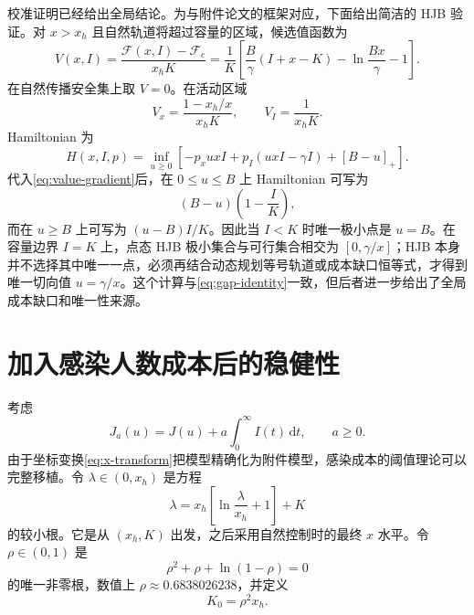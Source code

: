 \documentclass[11pt,a4paper,UTF8]{ctexart}
\theoremstyle{definition}
\newcommand{\Fcal}{\mathcal{F}}
\newcommand{\pos}[1]{\left[#1\right]_{+}}
\newcommand{\dd}{\,\mathrm{d}}
\begin{document}
校准证明已经给出全局结论。为与附件论文的框架对应，下面给出简洁的 HJB 验证。对 $x>x_h$ 且自然轨道将超过容量的区域，候选值函数为
\begin{equation}
V(x,I)=\frac{\Fcal(x,I)-\Fcal_c}{x_hK}
=\frac1K\left[
\frac{B}{\gamma}(I+x-K)-\ln\frac{Bx}{\gamma}-1
\right].
\label{eq:value-explicit}
\end{equation}
在自然传播安全集上取 $V=0$。在活动区域
\begin{equation}
V_x=\frac{1-x_h/x}{x_hK},\qquad
V_I=\frac1{x_hK}.
\label{eq:value-gradient}
\end{equation}
Hamiltonian 为
\begin{equation}
H(x,I,p)=\inf_{u\ge0}
\left[-p_xuxI+p_I(uxI-\gamma I)+\pos{B-u}\right].
\label{eq:Hamiltonian}
\end{equation}
代入\eqref{eq:value-gradient}后，在 $0\le u\le B$ 上 Hamiltonian 可写为
\[
(B-u)\left(1-\frac{I}{K}\right),
\]
而在 $u\ge B$ 上可写为 $(u-B)I/K$。因此当 $I<K$ 时唯一极小点是 $u=B$。在容量边界 $I=K$ 上，点态 HJB 极小集合与可行集合相交为 $[0,\gamma/x]$；HJB 本身并不选择其中唯一一点，必须再结合动态规划等号轨道或成本缺口恒等式，才得到唯一切向值 $u=\gamma/x$。这个计算与\eqref{eq:gap-identity}一致，但后者进一步给出了全局成本缺口和唯一性来源。

\section{加入感染人数成本后的稳健性}

考虑
\begin{equation}
J_a(u)=J(u)+a\int_0^\infty I(t)\dd t,
\qquad a\ge0.
\label{eq:infection-cost}
\end{equation}
由于坐标变换\eqref{eq:x-transform}把模型精确化为附件模型，感染成本的阈值理论可以完整移植。令 $\lambda\in(0,x_h)$ 是方程
\begin{equation}
\lambda=x_h\left[\ln\frac{\lambda}{x_h}+1\right]+K
\label{eq:lambda-equation}
\end{equation}
的较小根。它是从 $(x_h,K)$ 出发，之后采用自然控制时的最终 $x$ 水平。令 $\rho\in(0,1)$ 是
\begin{equation}
\rho^2+\rho+\ln(1-\rho)=0
\label{eq:rho-equation}
\end{equation}
的唯一非零根，数值上 $\rho\approx0.6838026238$，并定义
\begin{equation}
K_0=\rho^2x_h.
\label{eq:K0}
\end{equation}
\end{document}
